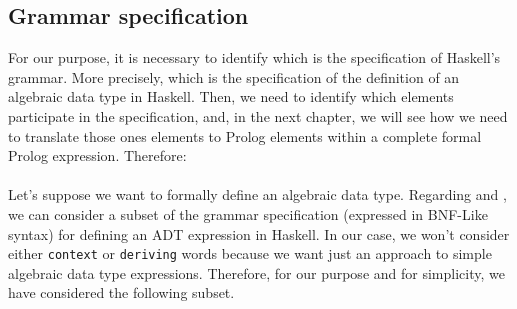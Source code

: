 \documentclass{report}
\theoremstyle{definition}
\theoremstyle{definition}
\begin{document}
\subsection{Grammar specification}

For our purpose, it is necessary to identify which is the specification of Haskell's grammar. More precisely, which is the specification of the definition of an algebraic data type in Haskell. Then, we need to identify which elements participate in the specification, and, in the next chapter, we will see how we need to translate those ones elements to Prolog elements within a complete formal Prolog expression. Therefore: \\\\
Let's suppose we want to formally define an algebraic data type. Regarding \cite{hasksynt} and \cite{haskdat}, we can consider a subset of the grammar specification (expressed in BNF-Like syntax) for defining an ADT expression in Haskell. In our case, we won't consider either \texttt{context} or \texttt{deriving} words because we want just an approach to simple algebraic data type expressions. Therefore, for our purpose and for simplicity, we have considered the following subset.\\
\end{document}
